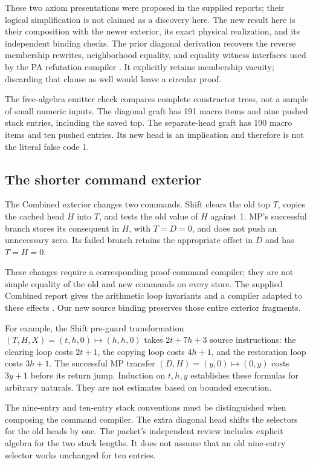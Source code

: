 \documentclass[11pt,letterpaper]{article}
\begin{document}
These two axiom presentations were proposed in the supplied reports;
their logical simplification is not claimed as a discovery here.
The new result here is their composition with the newer exterior,
its exact physical realization, and its independent binding checks.
The prior diagonal derivation recovers the reverse membership rewrites,
neighborhood equality, and equality witness interfaces used by the PA
refutation compiler \cite{new196}. It explicitly retains membership
vacuity; discarding that clause as well would leave a circular proof.

The free-algebra emitter check compares complete constructor trees,
not a sample of small numeric inputs. The diagonal graft has 191 macro
items and nine pushed stack entries, including the saved top. The
separate-head graft has 190 macro items and ten pushed entries. Its
new head is an implication and therefore is not the literal false code 1.

\subsection{The shorter command exterior}

The Combined exterior changes two commands. Shift clears the old top
$T$, copies the cached head $H$ into $T$, and tests the old value of $H$
against 1. MP's successful branch stores its consequent in $H$, with
$T=D=0$, and does not push an unnecessary zero. Its failed branch retains
the appropriate offset in $D$ and has $T=H=0$.

These changes require a corresponding proof-command compiler; they are
not simple equality of the old and new commands on every store. The
supplied Combined report gives the arithmetic loop invariants and a
compiler adapted to these effects \cite{combined}. Our new source
binding preserves those entire exterior fragments.

For example, the Shift pre-guard transformation
$(T,H,X)=(t,h,0)\mapsto(h,h,0)$ takes $2t+7h+3$ source instructions:
the clearing loop costs $2t+1$, the copying loop costs $4h+1$, and
the restoration loop costs $3h+1$. The successful MP transfer
$(D,H)=(y,0)\mapsto(0,y)$ costs $3y+1$ before its return jump.
Induction on $t,h,y$ establishes these formulas for arbitrary naturals.
They are not estimates based on bounded execution.

The nine-entry and ten-entry stack conventions must be distinguished
when composing the command compiler. The extra diagonal head shifts
the selectors for the old heads by one. The packet's independent review
includes explicit algebra for the two stack lengths. It does not assume
that an old nine-entry selector works unchanged for ten entries.
\end{document}
